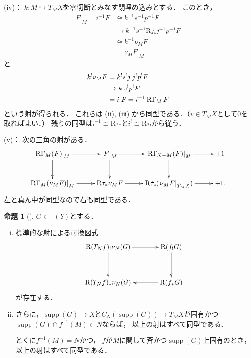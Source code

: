 \documentclass[uplatex,dvipdfmx,a4paper,10pt,draft]{jsarticle}
\makeatletter
\theoremstyle{definition}
\renewenvironment{proof}[1][\proofname]{\par
  \pushQED{\qed}%
  \normalfont \topsep6\p@\@plus6\p@\relax
  \trivlist
  \item[\hskip\labelsep
         \bfseries
    {#1}]\ignorespaces
}{%
  \popQED\endtrivlist\@endpefalse
}
\renewcommand{\proofname}{証明.}
\numberwithin{equation}{section}
\newcommand{\supp}{\mathop{\mathrm{supp}}\nolimits}
\newcommand{\Dompb}{\mathop{\mathsf{D}^\mathrm{b}}\nolimits}
\newcommand{\RG}{\mathop{\mathrm{R}\hspace{-0pt}\Gamma}\nolimits}
\newcommand{\Rder}{\mathrm{R}}
\newcommand{\mres}[2][]{{\left.{#1}\right\rvert}_{#2}}
\theoremstyle{mystyle}
\newtheorem{myprp}[mythm]{命題}
\newenvironment{prp}{\begin{prpbox}\begin{myprp}}{\end{myprp}\end{prpbox}}
\makeatother
\begin{document}
\begin{proof}
    (iv)：
    \(k\colon M\hookrightarrow T_{M}X\)を零切断とみなす閉埋め込みとする．
    このとき，\begin{align*}
        \mres[F]{M}
        =i^{-1}F
        &\cong k^{-1}s^{-1}p^{-1}F\\
        &\to k^{-1}s^{-1}\Rder{j}_{\ast}j^{-1}p^{-1}F\\
        &\cong k^{-1}\nu_{M}F\\
        &=\mres[\nu_{M}F]{M}
    \end{align*}
    と\begin{align*}
        k^{!}\nu_{M}F
        &= k^{!}s^{!}j_{!}j^{!}p^{!}F\\
        &\to k^{!}s^{!}p^{!}F\\
        &= i^{!}F=i^{-1}\RG_{M}F
    \end{align*}
    という射が得られる．
    これらは (ii), (iii) から同型である．（\(v\in T_{M}X\)として\(0\)を取ればよい．）
    残りの同型は\(i^{-1}\cong \Rder{\tau}_{\ast}\)と\(i^{!}\cong \Rder{\tau}_{!}\)から従う．

    (v)：
    次の三角の射がある．
    \[    
        \vcenter{\xymatrix@C=26pt@R=26pt{
        \mres[\RG_{M}(F)]{M}    
        \ar[d]
        \ar[r]
        &
        \mres[F]{M}    
        \ar[r]
        \ar[d]
        &
        \mres[\RG_{X-M}(F)]{M}    
        \ar[r]
        \ar[d]
        &
        +1
        \\
        \mres[\RG_{M}(\nu_{M}F)]{M}    
        \ar[r]
        &
        \Rder{\tau_{\ast}}\nu_{M}F    
        \ar[r]
        &
        \Rder{\dot{\tau}}_{\ast}(\mres[\nu_{M}F]{\dot{T}_{M}X})    
        \ar[r]
        &
        +1.
      }}
    \]
    左と真ん中が同型なので右も同型である．
\end{proof}

\begin{prp}[{\cite[Prop.4.2.4]{KS90}}]
    \(G\in\Dompb(Y)\)とする．
    \begin{enumerate}[(i)]
        \item 標準的な射による可換図式    \[    
            \vcenter{\xymatrix@C=36pt@R=36pt{
            \Rder(T_{N}f)_{!}\nu_{N}(G)
            \ar[d]
            \ar[r]
            &
            \Rder({f_{!}}G)
            \ar[d]
            \\
            \Rder(T_{N}f)_{\ast}\nu_{N}(G)
            &
            \Rder({f_{\ast}}G)
            \ar[l]
          }}
        \]が存在する．
        \item さらに，\(\supp(G)\to X\)と\(
            C_N(\supp(G))\to T_{M}X
        \)が固有かつ\(\supp(G)\cap f^{-1}(M)\subset N\)ならば，
        以上の射はすべて同型である．
        
        とくに\(f^{-1}(M)=N\)かつ，
        \(f\)が\(M\)に関して斉かつ\(\supp(G)\)上固有のとき，
        以上の射はすべて同型である．
    \end{enumerate}
\end{prp}
\end{document}
